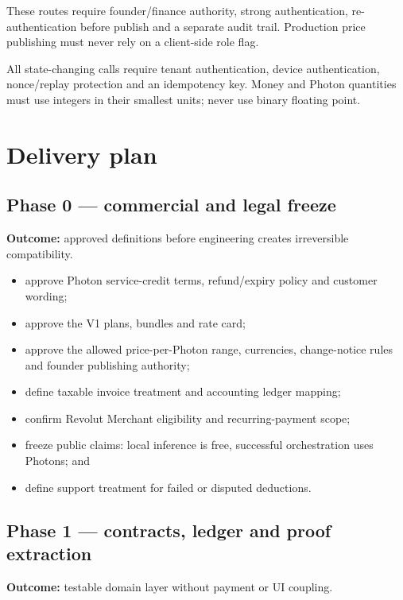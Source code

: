 \documentclass[11pt]{article}
\begin{document}
These routes require founder/finance authority, strong authentication, re-authentication before publish and a separate audit trail. Production price publishing must never rely on a client-side role flag.

All state-changing calls require tenant authentication, device authentication, nonce/replay protection and an idempotency key. Money and Photon quantities must use integers in their smallest units; never use binary floating point.

\section{Delivery plan}

\subsection{Phase 0 --- commercial and legal freeze}

\textbf{Outcome:} approved definitions before engineering creates irreversible compatibility.

\begin{itemize}
  \item approve Photon service-credit terms, refund/expiry policy and customer wording;
  \item approve the V1 plans, bundles and rate card;
  \item approve the allowed price-per-Photon range, currencies, change-notice rules and founder publishing authority;
  \item define taxable invoice treatment and accounting ledger mapping;
  \item confirm Revolut Merchant eligibility and recurring-payment scope;
  \item freeze public claims: local inference is free, successful orchestration uses Photons; and
  \item define support treatment for failed or disputed deductions.
\end{itemize}

\subsection{Phase 1 --- contracts, ledger and proof extraction}

\textbf{Outcome:} testable domain layer without payment or UI coupling.
\end{document}

